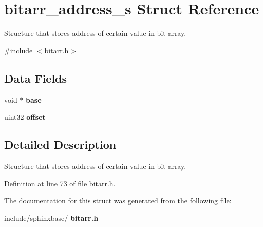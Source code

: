 \section{bitarr\+\_\+address\+\_\+s Struct Reference}
\label{structbitarr__address__s}


Structure that stores address of certain value in bit array.  




{\ttfamily \#include $<$bitarr.\+h$>$}

\subsection*{Data Fields}
\begin{DoxyCompactItemize}
\item 
\mbox{\label{structbitarr__address__s_a2ac6eb57a1f8feea9d3ab947af61cd26}} 
void $\ast$ {\bfseries base}
\item 
\mbox{\label{structbitarr__address__s_a25e454a04427113d373f6200a6c87de2}} 
uint32 {\bfseries offset}
\end{DoxyCompactItemize}


\subsection{Detailed Description}
Structure that stores address of certain value in bit array. 

Definition at line 73 of file bitarr.\+h.



The documentation for this struct was generated from the following file\+:\begin{DoxyCompactItemize}
\item 
include/sphinxbase/\textbf{ bitarr.\+h}\end{DoxyCompactItemize}
